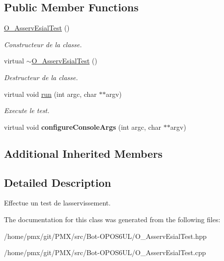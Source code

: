 \subsection*{Public Member Functions}
\begin{DoxyCompactItemize}
\item 
\mbox{\label{classO__AsservEsialTest_a964f8d2614c138c29a95d782b60f269c}} 
\hyperlink{classO__AsservEsialTest_a964f8d2614c138c29a95d782b60f269c}{O\+\_\+\+Asserv\+Esial\+Test} ()
\begin{DoxyCompactList}\small\item\em Constructeur de la classe. \end{DoxyCompactList}\item 
\mbox{\label{classO__AsservEsialTest_a0e1400eecd933b8a24e60b286835232b}} 
virtual \hyperlink{classO__AsservEsialTest_a0e1400eecd933b8a24e60b286835232b}{$\sim$\+O\+\_\+\+Asserv\+Esial\+Test} ()
\begin{DoxyCompactList}\small\item\em Destructeur de la classe. \end{DoxyCompactList}\item 
\mbox{\label{classO__AsservEsialTest_af4ba3aac5f013e385a2be034b92e9748}} 
virtual void \hyperlink{classO__AsservEsialTest_af4ba3aac5f013e385a2be034b92e9748}{run} (int argc, char $\ast$$\ast$argv)
\begin{DoxyCompactList}\small\item\em Execute le test. \end{DoxyCompactList}\item 
\mbox{\label{classO__AsservEsialTest_a322bf0633940600ffc36c33939e6467e}} 
virtual void {\bfseries configure\+Console\+Args} (int argc, char $\ast$$\ast$argv)
\end{DoxyCompactItemize}
\subsection*{Additional Inherited Members}


\subsection{Detailed Description}
Effectue un test de l\textquotesingle{}asservissement. 

The documentation for this class was generated from the following files\+:\begin{DoxyCompactItemize}
\item 
/home/pmx/git/\+P\+M\+X/src/\+Bot-\/\+O\+P\+O\+S6\+U\+L/O\+\_\+\+Asserv\+Esial\+Test.\+hpp\item 
/home/pmx/git/\+P\+M\+X/src/\+Bot-\/\+O\+P\+O\+S6\+U\+L/O\+\_\+\+Asserv\+Esial\+Test.\+cpp\end{DoxyCompactItemize}
